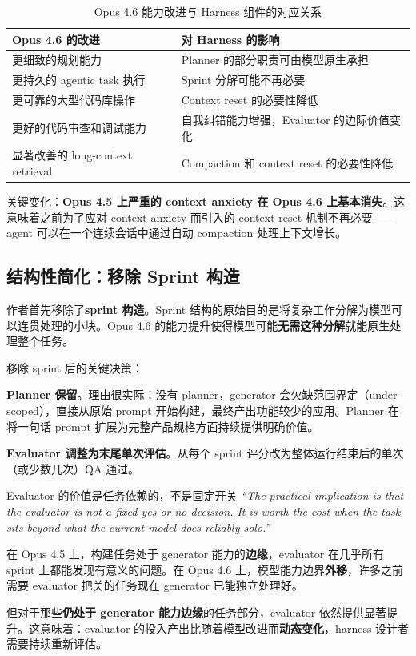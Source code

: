 \begin{table}[H]
\centering
\renewcommand{\arraystretch}{1.3}
\begin{tabular}{p{5cm}p{7.5cm}}
\toprule
\textbf{Opus 4.6 的改进} & \textbf{对 Harness 的影响} \\
\midrule
更细致的规划能力 & Planner 的部分职责可由模型原生承担 \\
\midrule
更持久的 agentic task 执行 & Sprint 分解可能不再必要 \\
\midrule
更可靠的大型代码库操作 & Context reset 的必要性降低 \\
\midrule
更好的代码审查和调试能力 & 自我纠错能力增强，Evaluator 的边际价值变化 \\
\midrule
显著改善的 long-context retrieval & Compaction 和 context reset 的必要性降低 \\
\bottomrule
\end{tabular}
\caption{Opus 4.6 能力改进与 Harness 组件的对应关系}
\end{table}

关键变化：\textbf{Opus 4.5 上严重的 context anxiety 在 Opus 4.6 上基本消失}。这意味着之前为了应对 context anxiety 而引入的 context reset 机制不再必要——agent 可以在一个连续会话中通过自动 compaction 处理上下文增长。

\subsection{结构性简化：移除 Sprint 构造}

作者首先移除了\textbf{sprint 构造}。Sprint 结构的原始目的是将复杂工作分解为模型可以连贯处理的小块。Opus 4.6 的能力提升使得模型可能\textbf{无需这种分解}就能原生处理整个任务。

移除 sprint 后的关键决策：

\textbf{Planner 保留}。理由很实际：没有 planner，generator 会欠缺范围界定（under-scoped），直接从原始 prompt 开始构建，最终产出功能较少的应用。Planner 在将一句话 prompt 扩展为完整产品规格方面持续提供明确价值。

\textbf{Evaluator 调整为末尾单次评估}。从每个 sprint 评分改为整体运行结束后的单次（或少数几次）QA 通过。

\begin{warningbox}{Evaluator 的价值是任务依赖的，不是固定开关}
\textit{``The practical implication is that the evaluator is not a fixed yes-or-no decision. It is worth the cost when the task sits beyond what the current model does reliably solo.''}

在 Opus 4.5 上，构建任务处于 generator 能力的\textbf{边缘}，evaluator 在几乎所有 sprint 上都能发现有意义的问题。在 Opus 4.6 上，模型能力边界\textbf{外移}，许多之前需要 evaluator 把关的任务现在 generator 已能独立处理好。

但对于那些\textbf{仍处于 generator 能力边缘}的任务部分，evaluator 依然提供显著提升。这意味着：evaluator 的投入产出比随着模型改进而\textbf{动态变化}，harness 设计者需要持续重新评估。
\end{warningbox}

